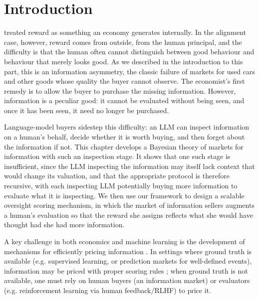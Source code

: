 \section{Introduction}\label{infonomy:sec:intro}
\begin{draftblock}
 treated reward as something an economy generates internally. In the alignment case, however, reward comes from outside, from the human principal, and the difficulty is that the human often cannot distinguish between good behaviour and behaviour that merely looks good. As we described in the introduction to this part, this is an information asymmetry, the classic failure of markets for used cars and other goods whose quality the buyer cannot observe. The economist's first remedy is to allow the buyer to purchase the missing information. However, information is a peculiar good: it cannot be evaluated without being seen, and once it has been seen, it need no longer be purchased.

Language-model buyers sidestep this difficulty: an LLM can inspect information on a human's behalf, decide whether it is worth buying, and then forget about the information if not. This chapter develops a Bayesian theory of markets for information with such an inspection stage. It shows that one such stage is insufficient, since the LLM inspecting the information may itself lack context that would change its valuation, and that the appropriate protocol is therefore recursive, with each inspecting LLM potentially buying more information to evaluate what it is inspecting. We then use our framework to design a scalable oversight scoring mechanism, in which the market of information sellers augments a human's evaluation so that the reward she assigns reflects what she would have thought had she had more information.
\end{draftblock}




A key challenge in both economics and machine learning is the development of mechanisms for efficiently pricing information . In settings where ground truth is available (e.g. supervised learning, or prediction markets for well-defined events), information may be priced with proper scoring rules \citep{hansonLogarithmicMarketScoring2002}; when ground truth is not available, one must rely on human buyers (an information market) or evaluators (e.g. reinforcement learning via human feedback/RLHF) to price it.

